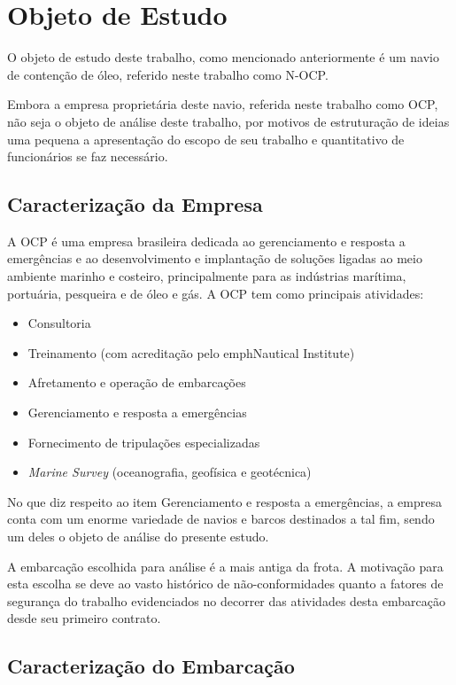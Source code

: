 \chapter{Objeto de Estudo}
O objeto de estudo deste trabalho, como mencionado anteriormente é um navio de contenção de óleo, referido neste trabalho como N-OCP. 

Embora a empresa proprietária deste navio, referida neste trabalho como OCP, não seja o objeto de análise deste trabalho, por motivos de estruturação de ideias uma pequena a apresentação do escopo de seu trabalho e quantitativo de funcionários se faz necessário.

\section{Caracterização da Empresa}
A OCP é uma empresa brasileira dedicada ao gerenciamento e resposta a emergências e ao desenvolvimento e implantação de soluções ligadas ao meio ambiente marinho e costeiro, principalmente para as indústrias marítima, portuária, pesqueira e de óleo e gás.
A OCP tem como principais atividades:
\begin{itemize}
\item Consultoria
\item Treinamento (com acreditação pelo emph{Nautical Institute})
\item Afretamento e operação de embarcações
\item Gerenciamento e resposta a emergências
\item Fornecimento de tripulações especializadas
\item \emph{Marine Survey} (oceanografia, geofísica e geotécnica)
\end{itemize}

No que diz respeito ao item Gerenciamento e resposta a emergências, a empresa conta com um enorme variedade de navios e barcos destinados a tal fim, sendo um deles o objeto de análise do presente estudo.

A embarcação escolhida para análise é a mais antiga da frota. A motivação para esta escolha se deve ao vasto histórico de não-conformidades quanto a fatores de segurança do trabalho evidenciados no decorrer das atividades desta embarcação desde seu primeiro contrato. 

\section{Caracterização do Embarcação}
